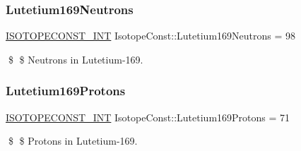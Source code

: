 \subsubsection{\texorpdfstring{Lutetium169\+Neutrons}{Lutetium169Neutrons}}
{\footnotesize\ttfamily \mbox{\hyperlink{group___isotope_const-_macros_ga5f18360b3e99483a35c32d789e62621c}{I\+S\+O\+T\+O\+P\+E\+C\+O\+N\+S\+T\+\_\+\+I\+NT}} Isotope\+Const\+::\+Lutetium169\+Neutrons = 98}

\$ \$ Neutrons in Lutetium-\/169. \mbox{\label{group___isotope_const-_lutetium-_lu169_ga56f275e3777a44627ee0747d5f3c0879}} 
\subsubsection{\texorpdfstring{Lutetium169\+Protons}{Lutetium169Protons}}
{\footnotesize\ttfamily \mbox{\hyperlink{group___isotope_const-_macros_ga5f18360b3e99483a35c32d789e62621c}{I\+S\+O\+T\+O\+P\+E\+C\+O\+N\+S\+T\+\_\+\+I\+NT}} Isotope\+Const\+::\+Lutetium169\+Protons = 71}

\$ \$ Protons in Lutetium-\/169. 